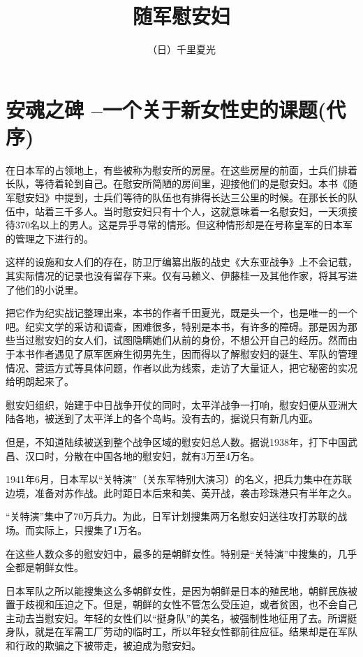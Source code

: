 \documentclass[12pt,UTF8]{ctexbook}
\title{\heiti\zihao{0} 随军慰安妇}
\author{（日）千里夏光}
\date{}
\begin{document}
\maketitle
\tableofcontents

\frontmatter

\chapter{安魂之碑 --一个关于新女性史的课题(代序)}

在日本军的占领地上，有些被称为慰安所的房屋。在这些房屋的前面，士兵们排着长队，等待着轮到自己。在慰安所简陋的房间里，迎接他们的是慰安妇。本书《随军慰安妇》中提到，士兵们等待的队伍也有排得长达三公里的时候。在那长长的队伍中，站着三千多人。当时慰安妇只有十个人，这就意味着一名慰安妇，一天须接待370名以上的男人。这是异乎寻常的情形。但这种情形却是在号称皇军的日本军的管理之下进行的。

这样的设施和女人们的存在，防卫厅编纂出版的战史《大东亚战争》上不会记载，其实际情况的记录也没有留存下来。仅有马赖义、伊藤桂一及其他作家，将其写进了他们的小说里。

把它作为纪实战记整理出来，本书的作者千田夏光，既是头一个，也是唯一的一个吧。纪实文学的采访和调查，困难很多，特别是本书，有许多的障碍。那是因为那些当过慰安妇的女人们，试图隐瞒她们从前的身份，不想公开自己的经历。然而由于本书作者遇见了原军医麻生彻男先生，因而得以了解慰安妇的诞生、军队的管理情况、营运方式等具体问题，作者以此为线索，走访了大量证人，把它秘密的实况给明朗起来了。

慰安妇组织，始建于中日战争开仗的同时，太平洋战争一打响，慰安妇便从亚洲大陆各地，被送到了太平洋上的各个岛屿。没有去的，据说只有新几内亚。

但是，不知道陆续被送到整个战争区域的慰安妇总人数。据说1938年，打下中国武昌、汉口时，分散在中国各地的慰安妇，就有3万至4万名。

1941年6月，日本军以“关特演”（关东军特别大演习）的名义，把兵力集中在苏联边境，准备对苏作战。此时距日本后来和美、英开战，袭击珍珠港只有半年之久。

“关特演”集中了70万兵力。为此，日军计划搜集两万名慰安妇送往攻打苏联的战场。而实际上，只搜集了1万名。

在这些人数众多的慰安妇中，最多的是朝鲜女性。特别是“关特演”中搜集的，几乎全都是朝鲜女性。

日本军队之所以能搜集这么多朝鲜女性，是因为朝鲜是日本的殖民地，朝鲜民族被置于歧视和压迫之下。但是，朝鲜的女性不管怎么受压迫，或者贫困，也不会自己主动去当慰安妇。年轻的女性们以“挺身队”的美名，被强制性地征用了去。所谓挺身队，就是在军需工厂劳动的临时工，所以年轻女性都前往应征。结果却是在军队和行政的欺骗之下被带走，被迫成为慰安妇。
\end{document}
